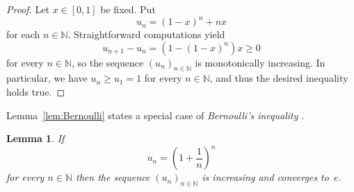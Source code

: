 \documentclass[12pt]{article}
\newcommand{\bN}{\mathbb{N}} %
\newtheorem{lemma}{Lemma}
\begin{document}
\begin{proof}
  Let $x \in [0, 1]$ be fixed.
  Put
  $$
  u _n =  \left( 1 - x \right)^n + n x  
  $$
  for each $n \in \bN$.
  Straightforward computations yield
  $$
  u_{n + 1} - u_n = \left(1 - {(1 - x)}^n \right) x \ge 0
  $$
  for every $n \in \bN$,
  so the sequence $\left( u_n \right)_{n \in \bN}$ is monotonically increasing.
  In particular, we have $u_n \ge u_1 = 1$ for every $n \in \bN$,
  and thus the desired inequality holds true.  
\end{proof}



Lemma~\ref{lem:Bernoulli} states a special case of \emph{Bernoulli's inequality} \cite{MitrinovicAI}.

\begin{lemma} \label{lem:convergence-to-e}
  If
  $$
  u_n = \left( 1 + \frac{1}{n} \right)^n
  $$
  for every $n \in \bN$ then the sequence $\left( u_n  \right)_{n \in \bN}$ is increasing and converges to~$e$.
\end{lemma}
\end{document}
